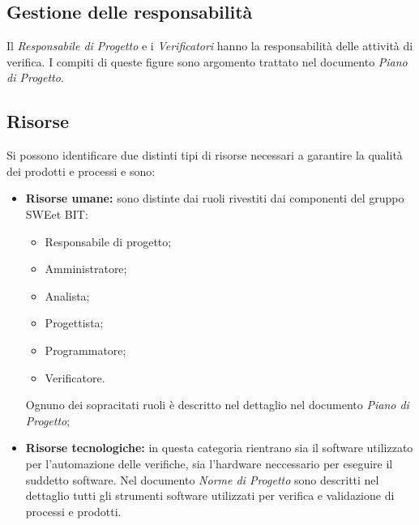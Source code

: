   \subsection{Gestione delle responsabilità}
    Il \emph{Responsabile di Progetto} e i \emph{Verificatori} hanno la responsabilità delle attività di verifica.
    I compiti di queste figure sono argomento trattato nel documento \emph{Piano di Progetto}.

  \subsection{Risorse}
    Si possono identificare due distinti tipi di risorse necessari a garantire la qualità dei prodotti e processi e sono:
    \begin{itemize}
      \item \textbf{Risorse umane:} sono distinte dai ruoli rivestiti dai componenti del gruppo SWEet BIT:
      \begin{itemize}
        \item Responsabile di progetto;
        \item Amministratore;
        \item Analista;
        \item Progettista;
        \item Programmatore;
        \item Verificatore.
      \end{itemize}
      Ognuno dei sopracitati ruoli è descritto nel dettaglio nel documento \emph{Piano di Progetto};
      \item \textbf{Risorse tecnologiche:} in questa categoria rientrano sia il software utilizzato per l'automazione delle verifiche,
      sia l'hardware neccessario per eseguire il suddetto software. Nel documento \emph{Norme di Progetto} sono descritti nel dettaglio
      tutti gli strumenti software utilizzati per verifica e validazione di processi e prodotti.
    \end{itemize}
